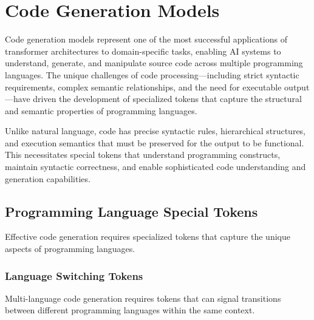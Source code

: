
\section{Code Generation Models}

Code generation models represent one of the most successful applications of transformer architectures to domain-specific tasks, enabling AI systems to understand, generate, and manipulate source code across multiple programming languages. The unique challenges of code processing—including strict syntactic requirements, complex semantic relationships, and the need for executable output—have driven the development of specialized tokens that capture the structural and semantic properties of programming languages.
\begin{comment}
Feedback: This is a strong introduction. To make the core challenge more vivid, you could add: "Unlike natural language, which is often ambiguous and flexible, code is a formal language where a single misplaced character can render the entire sequence invalid. This unforgiving nature requires special tokens that can explicitly represent the rigid syntax and deep, non-local dependencies inherent in programming."
\end{comment}

Unlike natural language, code has precise syntactic rules, hierarchical structures, and execution semantics that must be preserved for the output to be functional. This necessitates special tokens that understand programming constructs, maintain syntactic correctness, and enable sophisticated code understanding and generation capabilities.

\subsection{Programming Language Special Tokens}

Effective code generation requires specialized tokens that capture the unique aspects of programming languages.

\subsubsection{Language Switching Tokens}

Multi-language code generation requires tokens that can signal transitions between different programming languages within the same context.

